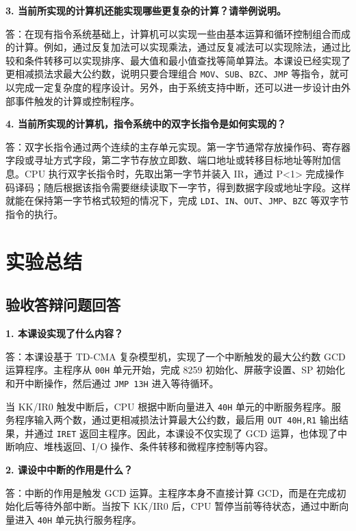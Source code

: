 \documentclass[UTF8,12pt,a4paper]{ctexart}
\newcommand{\hex}[1]{\texttt{#1H}}
\newcommand{\inst}[1]{\texttt{#1}}
\begin{document}
\noindent\textbf{3. 当前所实现的计算机还能实现哪些更复杂的计算？请举例说明。}

答：在现有指令系统基础上，计算机可以实现一些由基本运算和循环控制组合而成的计算。例如，通过反复加法可以实现乘法，通过反复减法可以实现除法，通过比较和条件转移可以实现排序、最大值和最小值查找等简单算法。本课设已经实现了更相减损法求最大公约数，说明只要合理组合 \inst{MOV}、\inst{SUB}、\inst{BZC}、\inst{JMP} 等指令，就可以完成一定复杂度的程序设计。另外，由于系统支持中断，还可以进一步设计由外部事件触发的计算或控制程序。

\vspace{0.8em}

\noindent\textbf{4. 当前所实现的计算机，指令系统中的双字长指令是如何实现的？}

答：双字长指令通过两个连续的主存单元实现。第一字节通常存放操作码、寄存器字段或寻址方式字段，第二字节存放立即数、端口地址或转移目标地址等附加信息。CPU 执行双字长指令时，先取出第一字节并装入 IR，通过 P<1> 完成操作码译码；随后根据该指令需要继续读取下一字节，得到数据字段或地址字段。这样就能在保持第一字节格式较短的情况下，完成 \inst{LDI}、\inst{IN}、\inst{OUT}、\inst{JMP}、\inst{BZC} 等双字节指令的执行。


\section{实验总结}

\subsection{验收答辩问题回答}

\textbf{1. 本课设实现了什么内容？}

答：本课设基于 TD-CMA 复杂模型机，实现了一个中断触发的最大公约数 GCD 运算程序。主程序从 \hex{00} 单元开始，完成 8259 初始化、屏蔽字设置、SP 初始化和开中断操作，然后通过 \inst{JMP 13H} 进入等待循环。

当 KK/IR0 触发中断后，CPU 根据中断向量进入 \hex{40} 单元的中断服务程序。服务程序输入两个数，通过更相减损法计算最大公约数，最后用 \inst{OUT 40H,R1} 输出结果，并通过 \inst{IRET} 返回主程序。因此，本课设不仅实现了 GCD 运算，也体现了中断响应、堆栈返回、I/O 操作、条件转移和微程序控制等内容。

\vspace{0.7em}

\textbf{2. 课设中中断的作用是什么？}

答：中断的作用是触发 GCD 运算。主程序本身不直接计算 GCD，而是在完成初始化后等待外部中断。当按下 KK/IR0 后，CPU 暂停当前等待状态，通过中断向量进入 \hex{40} 单元执行服务程序。
\end{document}
